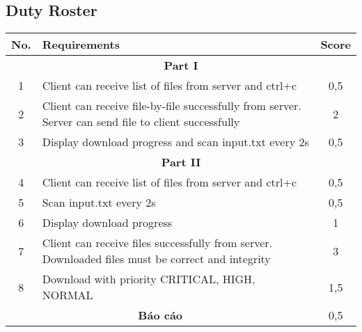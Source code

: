 \documentclass[a4paper,12pt]{report}
\begin{document}
\subsection*{Duty Roster}
\begin{center}
  \renewcommand{\arraystretch}{1.5}
  \begin{tabular}{|c|p{}|c|}
    \hline
    \textbf{No.}                           & \textbf{Requirements}                                                                                 & \textbf{Score} \\\hline
    \multicolumn{3}{|c|}{\textbf{Part I}}                                                                                                                           \\\hline
    1                                      & Client can receive list of files from server and ctrl+c                                               & 0,5            \\\hline
    2                                      & Client can receive file-by-file successfully from server. Server can send file to client successfully & 2              \\\hline
    3                                      & Display download progress and scan input.txt every 2s                                                 & 0,5            \\\hline
    \multicolumn{3}{|c|}{\textbf{Part II}}                                                                                                                          \\\hline
    4                                      & Client can receive list of files from server and ctrl+c                                               & 0,5            \\\hline
    5                                      & Scan input.txt every 2s                                                                               & 0,5            \\\hline
    6                                      & Display download progress                                                                             & 1              \\\hline
    7                                      & Client can receive files successfully from server. Downloaded files must be correct and integrity     & 3              \\\hline
    8                                      & Download with priority CRITICAL, HIGH, NORMAL                                                         & 1,5            \\\hline
    \multicolumn{2}{|c|}{\textbf{Báo cáo}} & 0,5                                                                                                                    \\\hline
  \end{tabular}
\end{center}
\end{document}
